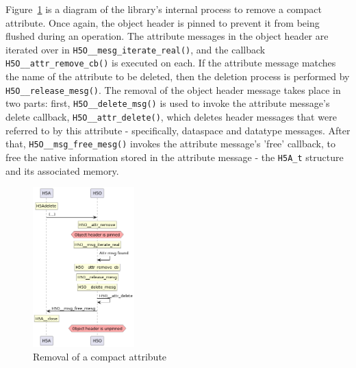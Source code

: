 Figure~\ref{fig:tour-3-uml-attr-remove-compact} is a diagram of the library's internal process to remove a compact attribute. Once again, the object header is pinned to prevent it from being flushed during an operation. The attribute messages in the object header are iterated over in \texttt{H5O\_\_mesg\_iterate\_real()}, and the callback \texttt{H5O\_\_attr\_remove\_cb()} is executed on each. If the attribute message matches the name of the attribute to be deleted, then the deletion process is performed by \texttt{H5O\_\_release\_mesg()}. The removal of the object header message takes place in two parts: first, \texttt{H5O\_\_delete\_msg()} is used to invoke the attribute message's delete callback, \texttt{H5O\_\_attr\_delete()}, which deletes header messages that were referred to by this attribute - specifically, dataspace and datatype messages. After that, \texttt{H5O\_\_msg\_free\_mesg()} invokes the attribute message's 'free' callback, to free the native information stored in the attribute message - the \texttt{H5A\_t} structure and its associated memory.

\begin{figure}
    \centering
    \includegraphics[width=0.35\textwidth]{images/tour_3_uml_attr_remove_compact.png}
    \caption{Removal of a compact attribute}
    \label{fig:tour-3-uml-attr-remove-compact}
\end{figure}

